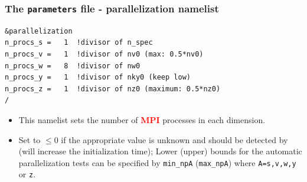 \documentclass[9pt]{beamer}
\newcommand{\cR}[1]{\textcolor{red}{#1}}
\begin{document}
\begin{frame}[fragile] %
  \frametitle{The {\tt parameters} file - parallelization namelist}

\begin{block} %

\begin{block}

\begin{verbatim}
&parallelization
n_procs_s =   1  !divisor of n_spec
n_procs_v =   1  !divisor of nv0 (max: 0.5*nv0)
n_procs_w =   8  !divisor of nw0
n_procs_y =   1  !divisor of nky0 (keep low)
n_procs_z =   1  !divisor of nz0 (maximum: 0.5*nz0)
/
\end{verbatim}

\end{block}
\begin{itemize}
\item This namelist sets the number of \cR{\bf MPI} processes in each dimension.
\item Set to $\leq 0$ if the appropriate value is unknown and should be detected by \gene (will increase the initialization time); Lower (upper) bounds for the automatic parallelization tests can be specified by {\tt min\_npA} ({\tt max\_npA})  where {\tt A=s,v,w,y} or {\tt z}.
\end{itemize}
\end{block}

\end{frame}


\end{document}
